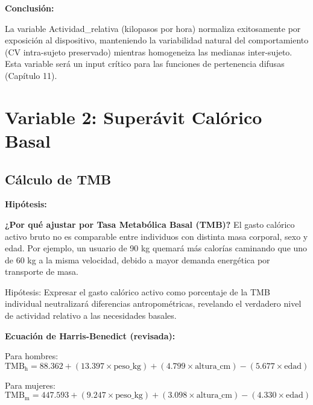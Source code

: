 \documentclass[12pt,letterpaper,twoside]{report}
\begin{document}
\begin{conclusionbox}
\textbf{Conclusión:}

La variable Actividad\_relativa (kilopasos por hora) normaliza exitosamente por exposición al dispositivo, manteniendo la variabilidad natural del comportamiento (CV intra-sujeto preservado) mientras homogeneiza las medianas inter-sujeto. Esta variable será un input crítico para las funciones de pertenencia difusas (Capítulo 11).
\end{conclusionbox}

\section{Variable 2: Superávit Calórico Basal}

\subsection{Cálculo de TMB}

\begin{hipotesisbox}
\textbf{Hipótesis:}

\textbf{¿Por qué ajustar por Tasa Metabólica Basal (TMB)?} El gasto calórico activo bruto no es comparable entre individuos con distinta masa corporal, sexo y edad. Por ejemplo, un usuario de 90 kg quemará más calorías caminando que uno de 60 kg a la misma velocidad, debido a mayor demanda energética por transporte de masa.

Hipótesis: Expresar el gasto calórico activo como porcentaje de la TMB individual neutralizará diferencias antropométricas, revelando el verdadero nivel de actividad relativo a las necesidades basales.
\end{hipotesisbox}

\begin{estadisticobox}
\textbf{Ecuación de Harris-Benedict (revisada):}

Para hombres:
\begin{equation}
\text{TMB}_{\text{h}} = 88.362 + (13.397 \times \text{peso\_kg}) + (4.799 \times \text{altura\_cm}) - (5.677 \times \text{edad})
\end{equation}

Para mujeres:
\begin{equation}
\text{TMB}_{\text{m}} = 447.593 + (9.247 \times \text{peso\_kg}) + (3.098 \times \text{altura\_cm}) - (4.330 \times \text{edad})
\end{equation}
\end{estadisticobox}
\end{document}
